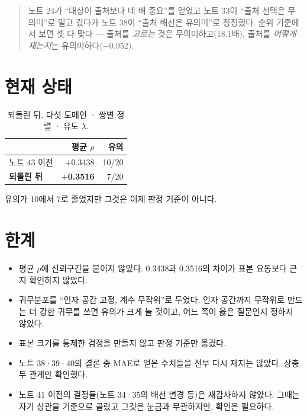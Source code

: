 \documentclass[10pt]{article}
\begin{document}
\begin{quote}\fontsize{9.5}{11.5}\selectfont
노트 24가 ``대상이 출처보다 네 배 중요''를 얻었고 노트 33이 ``출처 선택은
무의미''로 밀고 갔다가 노트 38이 ``출처 배선은 유의미''로 정정했다. 순위 기준에서
보면 셋 다 맞다 --- 출처를 \emph{고르는} 것은 무의미하고(18.1배), 출처를
\emph{어떻게 재는지}는 유의미하다($-$0.952).
\end{quote}

\section{현재 상태}

\begin{table}[t]
\centering\tsize
\caption{되돌린 뒤. 다섯 도메인 · 쌍별 정렬 · 유도 $\lambda$.}
\begin{tabular}{lrr}
\toprule
& 평균 $\rho$ & 유의 \\
\midrule
노트 43 이전 & $+$0.3438 & 10/20 \\
\textbf{되돌린 뒤} & \textbf{$+$0.3516} & 7/20 \\
\bottomrule
\end{tabular}
\end{table}

유의가 10에서 7로 줄었지만 그것은 이제 판정 기준이 아니다.

\section{한계}

\begin{itemize}[leftmargin=1.1em,itemsep=0.15em]
\item 평균 $\rho$에 신뢰구간을 붙이지 않았다. 0.3438과 0.3516의 차이가 표본
      요동보다 큰지 확인하지 않았다.
\item 귀무분포를 ``인자 공간 고정, 계수 무작위''로 두었다. 인자 공간까지 무작위로
      만드는 더 강한 귀무를 쓰면 유의가 크게 늘 것이고, 어느 쪽이 옳은 질문인지
      정하지 않았다.
\item 표본 크기를 통제한 검정을 만들지 않고 판정 기준만 옮겼다.
\item 노트 38·39·40의 결론 중 MAE로 얻은 수치들을 전부 다시 재지는 않았다.
      상충 두 관계만 확인했다.
\item 노트 41 이전의 결정들(노트 34·35의 배선 변경 등)은 재감사하지 않았다.
      그때는 자기 상관을 기준으로 골랐고 그것은 눈금과 무관하지만, 확인은 필요하다.
\end{itemize}
\end{document}
